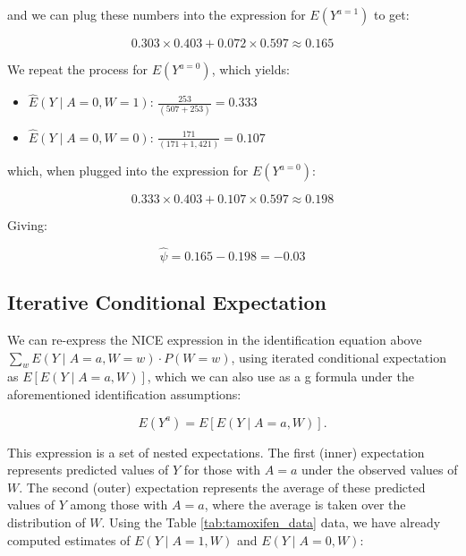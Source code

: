 \documentclass[12pt]{article}
\numberwithin{equation}{section}
\begin{document}
\noindent and we can plug these numbers into the expression for $E(Y^{a = 1})$ to get:

\begin{equation}
0.303 \times 0.403 + 0.072 \times 0.597 \approx 0.165
\end{equation}

We repeat the process for $E(Y^{a = 0})$, which yields:

\begin{itemize}
    \item[] $\hat{E}(Y \mid A = 0, W = 1)$: $\frac{253}{(507+253)} = 0.333$
    \item[] $\hat{E}(Y \mid A = 0, W = 0)$: $\frac{171}{(171+1{,}421)} = 0.107$
\end{itemize}

\noindent which, when plugged into the expression for $E(Y^{a = 0})$:

\begin{equation}
0.333 \times 0.403 + 0.107 \times 0.597 \approx 0.198
\end{equation}


Giving:

\begin{equation}
\hat{\psi} = 0.165 - 0.198 = -0.03
\end{equation} 

\subsection{Iterative Conditional Expectation}

We can re-express the NICE expression in the identification equation above $\sum_w E(Y \mid A = a, W = w)\cdot P(W = w)$, using iterated conditional expectation as $E[E(Y \mid A = a, W)]$, which we can also use as a g formula under the aforementioned identification assumptions:

\begin{equation}
E(Y^a) = E[E(Y \mid A = a, W)].
\end{equation}

This expression is a set of nested expectations. The first (inner) expectation represents predicted values of $Y$ for those with $A=a$ under the observed values of $W$. The second (outer) expectation represents the average of these predicted values of $Y$ among those with $A=a$, where the average is taken over the distribution of $W$. Using the Table \ref{tab:tamoxifen_data} data, we have already computed estimates of $E(Y \mid A = 1, W)$ and $E(Y \mid A = 0, W)$:
\end{document}
